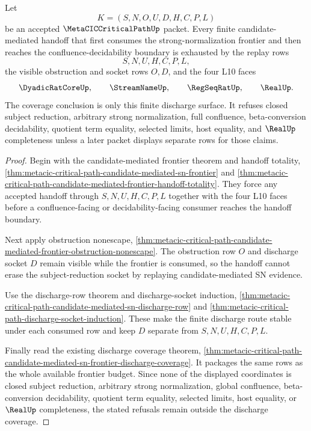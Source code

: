 \begin{theorem}
\label{thm:metacic-critical-path-candidate-frontier-discharge-coverage}
Let
$$
K=(S,N,O,U,D,H,C,P,L)
$$
be an accepted $\MetaCICCriticalPathUp$ packet. Every finite candidate-mediated handoff that first consumes the strong-normalization frontier and then reaches the confluence-decidability boundary is exhausted by the replay rows
$$
S,N,U,H,C,P,L,
$$
the visible obstruction and socket rows $O,D$, and the four L10 faces
$$
\DyadicRatCoreUp,\qquad
\StreamNameUp,\qquad
\RegSeqRatUp,\qquad
\RealUp .
$$
The coverage conclusion is only this finite discharge surface. It refuses closed subject reduction, arbitrary strong normalization, full confluence, beta-conversion decidability, quotient term equality, selected limits, host equality, and $\RealUp$ completeness unless a later packet displays separate rows for those claims.
\end{theorem}
\begin{proof}
Begin with the candidate-mediated frontier theorem and handoff totality, \autoref{thm:metacic-critical-path-candidate-mediated-sn-frontier} and \autoref{thm:metacic-critical-path-candidate-mediated-frontier-handoff-totality}. They force any accepted handoff through $S,N,U,H,C,P,L$ together with the four L10 faces before a confluence-facing or decidability-facing consumer reaches the handoff boundary.

Next apply obstruction nonescape, \autoref{thm:metacic-critical-path-candidate-mediated-frontier-obstruction-nonescape}. The obstruction row $O$ and discharge socket $D$ remain visible while the frontier is consumed, so the handoff cannot erase the subject-reduction socket by replaying candidate-mediated SN evidence.

Use the discharge-row theorem and discharge-socket induction, \autoref{thm:metacic-critical-path-candidate-mediated-sn-discharge-row} and \autoref{thm:metacic-critical-path-discharge-socket-induction}. These make the finite discharge route stable under each consumed row and keep $D$ separate from $S,N,U,H,C,P,L$.

Finally read the existing discharge coverage theorem, \autoref{thm:metacic-critical-path-candidate-mediated-sn-frontier-discharge-coverage}. It packages the same rows as the whole available frontier budget. Since none of the displayed coordinates is closed subject reduction, arbitrary strong normalization, global confluence, beta-conversion decidability, quotient term equality, selected limits, host equality, or $\RealUp$ completeness, the stated refusals remain outside the discharge coverage.
\end{proof}

